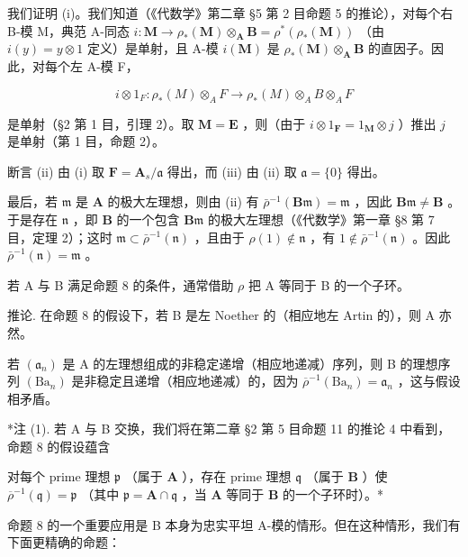 我们证明 (i)。我们知道（《代数学》第二章 §5 第 2 目命题 5 的推论），对每个右 B-模 M，典范 A-同态 \(i: \mathbf{M} \to \rho_*(\mathbf{M}) \otimes_{\mathbf{A}} \mathbf{B} = \rho^*(\rho_*(\mathbf{M}))\) （由 \(i(y) = y \otimes 1\) 定义）是单射，且 A-模 \(i(\mathbf{M})\) 是 \(\rho_*(\mathbf{M}) \otimes_{\mathbf{A}} \mathbf{B}\) 的直因子。因此，对每个左 A-模 F，

\[
i \otimes 1 _ {F}: \rho_ {*} (M) \otimes_ {A} F \rightarrow \rho_ {*} (M) \otimes_ {A} B \otimes_ {A} F
\]

是单射（§2 第 1 目，引理 2）。取 \(\mathbf{M} = \mathbf{E}\) ，则（由于 \(i \otimes 1_{\mathbf{F}} = 1_{\mathbf{M}} \otimes j\) ）推出 \(j\) 是单射（第 1 目，命题 2）。

断言 (ii) 由 (i) 取 \(\mathbf{F} = \mathbf{A}_s / \mathfrak{a}\) 得出，而 (iii) 由 (ii) 取 \(\mathfrak{a} = \{0\}\) 得出。

最后，若 \(\mathfrak{m}\) 是 \(\mathbf{A}\) 的极大左理想，则由 (ii) 有 \(\bar{\rho}^{-1}(\mathbf{B}\mathfrak{m}) = \mathfrak{m}\) ，因此 \(\mathbf{B}\mathfrak{m} \neq \mathbf{B}\) 。于是存在 \(\mathfrak{n}\) ，即 \(\mathbf{B}\) 的一个包含 \(\mathbf{B}\mathfrak{m}\) 的极大左理想（《代数学》第一章 §8 第 7 目，定理 2）；这时 \(\mathfrak{m} \subset \bar{\rho}^{-1}(\mathfrak{n})\) ，且由于 \(\rho(1) \notin \mathfrak{n}\) ，有 \(1 \notin \bar{\rho}^{-1}(\mathfrak{n})\) 。因此 \(\bar{\rho}^{-1}(\mathfrak{n}) = \mathfrak{m}\) 。

若 A 与 B 满足命题 8 的条件，通常借助 \(\rho\) 把 A 等同于 B 的一个子环。

推论. 在命题 8 的假设下，若 B 是左 Noether 的（相应地左 Artin 的），则 A 亦然。

若 \((\mathfrak{a}_n)\) 是 A 的左理想组成的非稳定递增（相应地递减）序列，则 B 的理想序列 \((\mathrm{Ba}_n)\) 是非稳定且递增（相应地递减）的，因为 \(\overline{\rho}^{-1}(\mathrm{Ba}_n) = \mathfrak{a}_n\) ，这与假设相矛盾。

*注 (1). 若 A 与 B 交换，我们将在第二章 §2 第 5 目命题 11 的推论 4 中看到，命题 8 的假设蕴含

对每个 \(\text{prime}\) 理想 \(\mathfrak{p}\) （属于 \(\mathbf{A}\) ），存在 \(\text{prime}\) 理想 \(\mathfrak{q}\) （属于 \(\mathbf{B}\) ）使 \(\overline{\rho}^{-1}(\mathfrak{q}) = \mathfrak{p}\) （其中 \(\mathfrak{p} = \mathbf{A} \cap \mathfrak{q}\) ，当 \(\mathbf{A}\) 等同于 \(\mathbf{B}\) 的一个子环时）。*

命题 8 的一个重要应用是 B 本身为忠实平坦 A-模的情形。但在这种情形，我们有下面更精确的命题：

